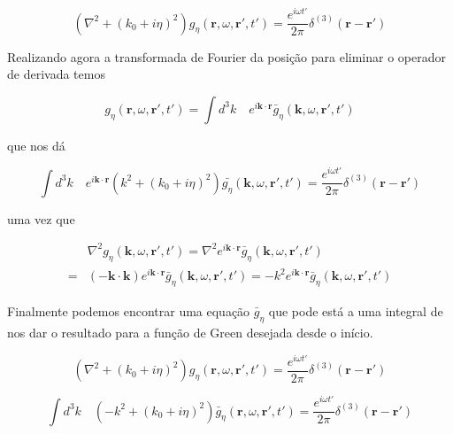 \begin{equation}
	\left( \nabla^2 + (k_0+i\eta)^2\right) g_{\eta}(\textbf{r},\omega, \textbf{r}', t') 
	= \frac{e^{i\omega t'}}{2\pi}\delta^{(3)}(\textbf{r}-\textbf{r}')
\end{equation}

Realizando agora a transformada de Fourier da posição para eliminar o operador de derivada temos

\begin{equation}
	g_{\eta}(\textbf{r}, \omega, \textbf{r}', t') =
	\int d^3k \quad e^{i\textbf{k}\cdot\textbf{r}}\bar{g}_{\eta}(\textbf{k}, \omega, \textbf{r}', t')
\end{equation}

que nos dá

\begin{equation}
	\int d^3k \quad e^{i\textbf{k}\cdot\textbf{r}} \left( k^2 + (k_0+i\eta)^2\right) \bar{g_\eta}(\textbf{k},\omega, \textbf{r}', t') 
	= \frac{e^{i\omega t'}}{2\pi}\delta^{(3)}(\textbf{r}-\textbf{r}')
\end{equation}

uma vez que

\begin{equation}
	\begin{split}
	 & \nabla^2 g_{\eta}(\textbf{k}, \omega, \textbf{r}', t')
	= \nabla^2 e^{i\textbf{k}\cdot\textbf{r}}\bar{g}_{\eta}(\textbf{k}, \omega, \textbf{r}', t')\\
	= &(-\textbf{k}\cdot\textbf{k}) e^{i\textbf{k}\cdot\textbf{r}}\bar{g}_{\eta}(\textbf{k}, \omega, \textbf{r}', t')
	= -k^2 e^{i\textbf{k}\cdot\textbf{r}}\bar{g}_{\eta}(\textbf{k}, \omega, \textbf{r}', t')
	\end{split}
\end{equation}

Finalmente podemos encontrar uma equação $\bar{g}_\eta$ que pode está a uma integral de nos dar o resultado para a função de Green desejada desde o início.

\begin{equation}
	\left( \nabla^2 + (k_0+i\eta)^2\right) g_{\eta}(\textbf{r},\omega, \textbf{r}', t') 
	= \frac{e^{i\omega t'}}{2\pi}\delta^{(3)}(\textbf{r}-\textbf{r}')
\end{equation}

\begin{equation}
	\int d^3 k \quad \left( -k^2 + (k_0+i\eta)^2\right) \bar{g}_{\eta}(\textbf{r},\omega, \textbf{r}', t') 
	= \frac{e^{i\omega t'}}{2\pi}\delta^{(3)}(\textbf{r}-\textbf{r}')
\end{equation}

